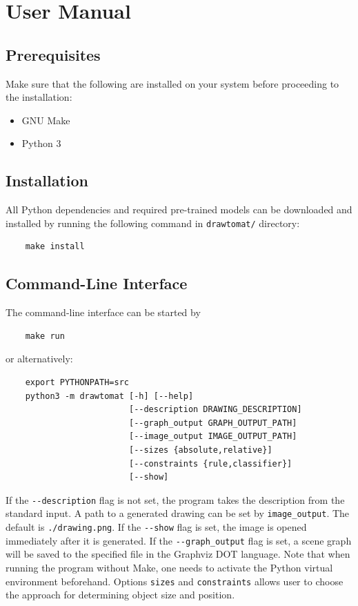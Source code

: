 \chapter{User Manual}

\section{Prerequisites}

Make sure that the following are installed on your system before proceeding to the installation:

\begin{itemize}
    \item GNU Make
    \item Python 3
\end{itemize}

\section{Installation}

All Python dependencies and required pre-trained models can be downloaded and installed by running the following command in \verb|drawtomat/| directory:

\begin{verbatim}
    make install
\end{verbatim}

\section{Command-Line Interface}

The command-line interface can be started by
\begin{verbatim}
    make run
\end{verbatim}
or alternatively:

\begin{verbatim}
    export PYTHONPATH=src
    python3 -m drawtomat [-h] [--help]
                         [--description DRAWING_DESCRIPTION] 
                         [--graph_output GRAPH_OUTPUT_PATH]
                         [--image_output IMAGE_OUTPUT_PATH]
                         [--sizes {absolute,relative}]
                         [--constraints {rule,classifier}]
                         [--show]
\end{verbatim}

If the \verb|--description| flag is not set, the program takes the description from the standard input. A path to a generated drawing can be set by \verb|image_output|. The default is \verb|./drawing.png|. If the \verb|--show| flag is set, the image is opened immediately after it is generated. If the \verb|--graph_output| flag is set, a scene graph will be saved to the specified file in the Graphviz DOT language. Note that when running the program without Make, one needs to activate the Python virtual environment beforehand. Options \verb|sizes| and \verb|constraints| allows user to choose the approach for determining object size and position.

